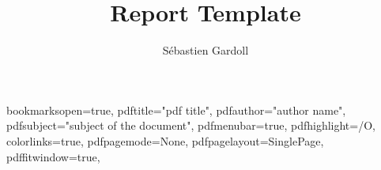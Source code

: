 


\graphicspath{{.}{resources/}}

\hypersetup
{
bookmarksopen=true,
pdftitle="pdf title",
pdfauthor="author name",
pdfsubject="subject of the document",
pdfmenubar=true,
pdfhighlight=/O,
colorlinks=true,
pdfpagemode=None,
pdfpagelayout=SinglePage,
pdffitwindow=true,
}

\title{Report Template}
\author{Sébastien Gardoll}







\frontmatter %
\pagestyle{footer_style}

\tableofcontents*

\mainmatter %
\pagestyle{report_style}



\appendix %



\backmatter
\pagestyle{footer_style}

\printbibliography[heading=bibintoc]
\listoffigures
\listoftables

